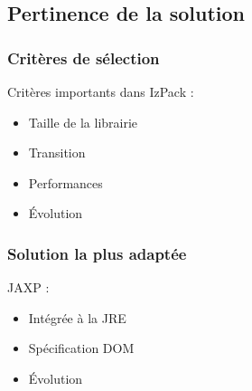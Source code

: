 \subsection{Pertinence de la solution}
\begin{frame}\frametitle{Critères de sélection}
Critères importants dans IzPack :
\begin{itemize}
	\item Taille de la librairie
	\item Transition
	\item Performances
	\item Évolution
\end{itemize}
\end{frame}
\begin{frame}\frametitle{Solution la plus adaptée}
JAXP :
\begin{itemize}
	\item Intégrée à la JRE
	\item Spécification DOM
	\item Évolution
\end{itemize}
\end{frame}
